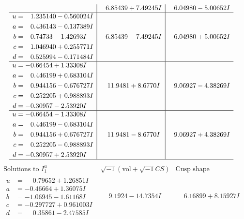 \documentclass[1p]{elsarticle_modified}
\theoremstyle{definition}
\newcommand{\I}{\sqrt{-1}}
\begin{document}
$$\begin{array}{c|c|c}
 & \phantom{-}6.85439 + 7.49245 I & \phantom{-}6.04980 - 5.00652 I \\ \hline\begin{aligned}
u &= \phantom{-}1.235140 - 0.560024 I \\
a &= \phantom{-}0.436143 - 0.137389 I \\
b &= -0.74733 - 1.42693 I \\
c &= \phantom{-}1.046940 + 0.255771 I \\
d &= \phantom{-}0.525994 - 0.171484 I\end{aligned}
 & \phantom{-}6.85439 - 7.49245 I & \phantom{-}6.04980 + 5.00652 I \\ \hline\begin{aligned}
u &= -0.66454 + 1.33308 I \\
a &= \phantom{-}0.446199 + 0.683104 I \\
b &= \phantom{-}0.944156 - 0.676727 I \\
c &= \phantom{-}0.252205 + 0.988893 I \\
d &= -0.30957 - 2.53920 I\end{aligned}
 & \phantom{-}11.9481 + 8.6770 I & \phantom{-}9.06927 - 4.38269 I \\ \hline\begin{aligned}
u &= -0.66454 - 1.33308 I \\
a &= \phantom{-}0.446199 - 0.683104 I \\
b &= \phantom{-}0.944156 + 0.676727 I \\
c &= \phantom{-}0.252205 - 0.988893 I \\
d &= -0.30957 + 2.53920 I\end{aligned}
 & \phantom{-}11.9481 - 8.6770 I & \phantom{-}9.06927 + 4.38269 I\\
 \hline 
 \end{array}$$\newpage$$\begin{array}{c|c|c}  
\text{Solutions to }I^u_{1}& \I (\text{vol} + \sqrt{-1}CS) & \text{Cusp shape}\\
 \hline 
\begin{aligned}
u &= \phantom{-}0.79652 + 1.26851 I \\
a &= -0.46664 + 1.36075 I \\
b &= -1.06945 - 1.61168 I \\
c &= -0.297727 + 0.961003 I \\
d &= \phantom{-}0.35861 - 2.47585 I\end{aligned}
 & \phantom{-}9.1924 - 14.7354 I & \phantom{-}6.16899 + 8.15927 I \\ \hline\begin{aligned}

\end{aligned}
\end{array}$$
\end{document}
